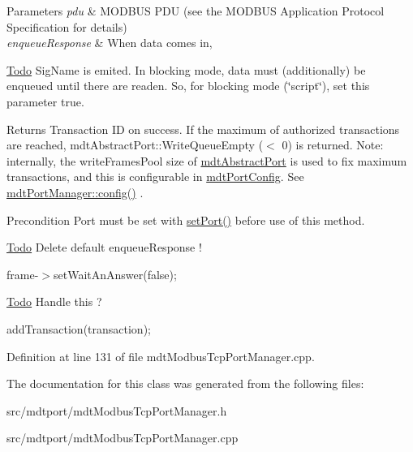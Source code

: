 \begin{DoxyParams}{Parameters}
{\em pdu} & MODBUS PDU (see the MODBUS Application Protocol Specification for details) \\
\hline
{\em enqueueResponse} & When data comes in,\\
\hline
\end{DoxyParams}
\begin{Desc}
\item[\hyperlink{todo__todo000022}{Todo}]SigName is emited. In blocking mode, data must (additionally) be enqueued until there are readen. So, for blocking mode (\char`\"{}script\char`\"{}), set this parameter true. \end{Desc}
\begin{DoxyReturn}{Returns}
Transaction ID on success. If the maximum of authorized transactions are reached, mdtAbstractPort::WriteQueueEmpty ($<$ 0) is returned. Note: internally, the writeFramesPool size of \hyperlink{classmdt_abstract_port}{mdtAbstractPort} is used to fix maximum transactions, and this is configurable in \hyperlink{classmdt_port_config}{mdtPortConfig}. See \hyperlink{classmdt_port_manager_a9cf3ea2da38f81682695b37448712ffd}{mdtPortManager::config()} . 
\end{DoxyReturn}
\begin{DoxyPrecond}{Precondition}
Port must be set with \hyperlink{classmdt_port_manager_afcd156b2d0c9d340999935efb6cd8cb6}{setPort()} before use of this method.
\end{DoxyPrecond}
\begin{Desc}
\item[\hyperlink{todo__todo000023}{Todo}]Delete default enqueueResponse ! \end{Desc}


frame-\/$>$setWaitAnAnswer(false);

\begin{Desc}
\item[\hyperlink{todo__todo000018}{Todo}]Handle this ? \end{Desc}


addTransaction(transaction); 



Definition at line 131 of file mdtModbusTcpPortManager.cpp.



The documentation for this class was generated from the following files:\begin{DoxyCompactItemize}
\item 
src/mdtport/mdtModbusTcpPortManager.h\item 
src/mdtport/mdtModbusTcpPortManager.cpp\end{DoxyCompactItemize}
